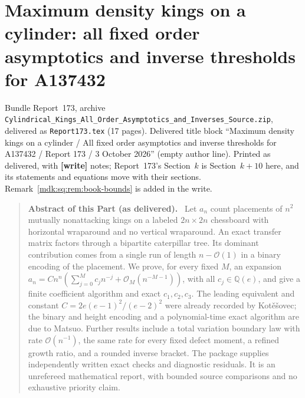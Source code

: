 \documentclass[11pt,letterpaper]{article}
\numberwithin{equation}{section}
\theoremstyle{remark}\newtheorem{remark}[theorem]{Remark}
\newcommand{\Oh}{\mathcal O}\newcommand{\Q}{\mathbb Q}\newcommand{\N}{\mathbb N}\newcommand{\R}{\mathbb R}
\newcommand{\file}[1]{\nolinkurl{#1}}
\newenvironment{partabstract}{\begin{quote}\small\noindent\textbf{Abstract of this Part (as delivered).}\ }{\end{quote}}
\newcommand{\partsource}[1]{\par\noindent\begin{minipage}{\textwidth}\small #1\end{minipage}\par\medskip}
\begin{document}
\part{Maximum density kings on a cylinder: all fixed order asymptotics and inverse thresholds for A137432}\label{mdk:sq:part}
\partsource{Bundle Report~173, archive \file{Cylindrical_Kings_All_Order_Asymptotics_and_Inverses_Source.zip}, delivered as \file{Report173.tex} (17 pages). Delivered title block ``Maximum density kings on a cylinder / All fixed order asymptotics and inverse thresholds for A137432 / Report 173 / 3 October 2026'' (empty author line). Printed as delivered, with \textbf{[write]} notes; Report~173's Section~$k$ is Section~$k+10$ here, and its statements and equations move with their sections. Remark~\ref{mdk:sq:rem:book-bounds} is added in the write.}
\begin{partabstract}
Let $a_n$ count placements of $n^2$ mutually nonattacking kings on a labeled $2n\times2n$ chessboard with horizontal wraparound and no vertical wraparound. An exact transfer matrix factors through a bipartite caterpillar tree. Its dominant contribution comes from a single run of length $n-\Oh(1)$ in a binary encoding of the placement. We prove, for every fixed $M$, an expansion
$a_n=Cn^n(\sum_{j=0}^M c_jn^{-j}+\Oh_M(n^{-M-1}))$, with all $c_j\in\Q(e)$, and give a finite coefficient algorithm and exact $c_1,c_2,c_3$. The leading equivalent and constant $C=2e(e-1)^2/(e-2)^2$ were already recorded by Kot\v{e}\v{s}ovec; the binary and height encoding and a polynomial-time exact algorithm are due to Matsuo. Further results include a total variation boundary law with rate $\Oh(n^{-1})$, the same rate for every fixed defect moment, a refined growth ratio, and a rounded inverse bracket. The package supplies independently written exact checks and diagnostic residuals. It is an unrefereed mathematical report, with bounded source comparisons and no exhaustive priority claim.
\end{partabstract}
\end{document}
